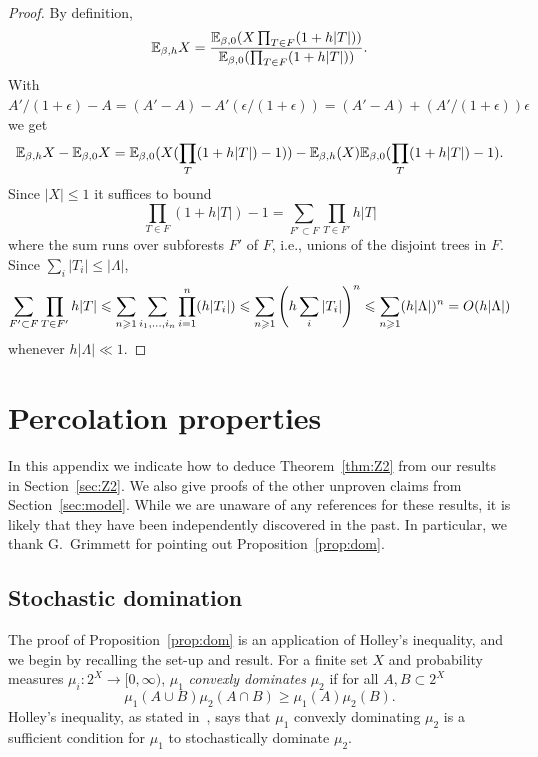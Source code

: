 \documentclass[11pt]{amsart}
\numberwithin{equation}{section}
\numberwithin{theorem}{section}
\begin{document}
\begin{proof}
  By definition,
  \begin{equation}
    \mathbb{E}_{\beta,h} X
    = \frac{\mathbb{E}_{\beta,0} (X \prod_{T\in F} (1+h|T|))}{\mathbb{E}_{\beta,0}(\prod_{T\in F} (1+h|T|))}.
  \end{equation}
  With $A'/(1+\epsilon)-A = (A'-A) - A' (\epsilon/(1+\epsilon)) = (A'-A) + (A'/(1+\epsilon)) \epsilon$ we get
  \begin{align}
    \mathbb{E}_{\beta,h}X - \mathbb{E}_{\beta,0} X
    = \mathbb{E}_{\beta,0}(X (\prod_{T} (1+h|T|)-1)) - \mathbb{E}_{\beta,h}(X)\mathbb{E}_{\beta,0}(\prod_{T} (1+h|T|)-1)  .
  \end{align}
  Since $|X|\leq 1$ it suffices to bound
  \begin{equation}
    \prod_{T\in  F} (1+h |T|)-1
    =
    \sum_{F' \subset F}\prod_{T\in  F'} h |T|
  \end{equation}
  where the sum runs over subforests $F'$ of $F$, i.e., unions of the disjoint trees in $F$.
  Since $\sum_i |T_i| \leq |\Lambda|$,
  \begin{equation}
    \sum_{F' \subset F}\prod_{T\in  F'} h |T|
    \leqslant \sum_{n\geqslant 1} \sum_{i_1, \dots, i_n} \prod_{i=1}^n (h|T_i|)
    \leqslant  \sum_{n\geqslant 1} \left({h\sum_{i} |T_i|}\right)^n
    \leqslant  \sum_{n\geqslant 1} (h|\Lambda|)^n = O(h|\Lambda|)
  \end{equation}
  whenever $h|\Lambda|\ll 1$.
\end{proof}


\appendix
\section{Percolation properties}
\label{sec:Perc}

In this appendix we indicate how to deduce Theorem~\ref{thm:Z2} from
our results in Section~\ref{sec:Z2}. We also give proofs
of the other unproven claims from Section~\ref{sec:model}. While we
are unaware of any references for these results, it is likely that
they have been independently discovered in the past.  In particular,
we thank G.\ Grimmett for pointing out Proposition~\ref{prop:dom}.

\subsection{Stochastic domination}
\label{sec:stoch-domin}

The proof of Proposition~\ref{prop:dom} is an application of Holley's
inequality, and we begin by recalling the set-up and result. For a
finite set $X$ and probability measures
$\mu_{i}\colon 2^{X}\to [0,\infty)$, $\mu_{1}$ \emph{convexly
  dominates} $\mu_{2}$ if for all $A,B\subset 2^{X}$
\begin{equation}
  \label{eq:CD}
  \mu_{1}(A\cup B)\mu_{2}(A\cap B) \geq \mu_{1}(A)\mu_{2}(B).
\end{equation}
Holley's inequality, as stated in~\cite{MR865241}, says that
$\mu_{1}$ convexly dominating $\mu_{2}$ is a sufficient condition
for $\mu_{1}$ to stochastically dominate $\mu_{2}$.  
\end{document}

